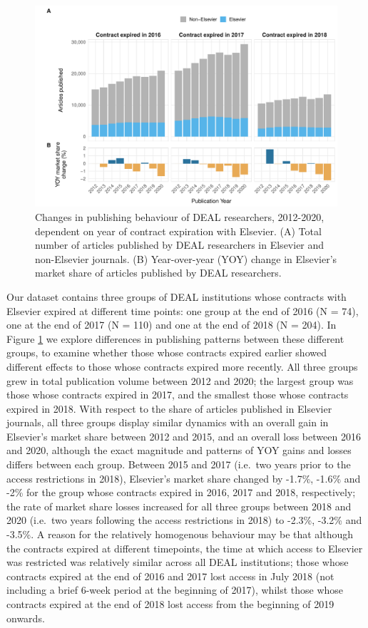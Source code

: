 \documentclass[
]{article}
\begin{document}
\begin{figure}

{\centering \includegraphics[width=0.75\linewidth]{analysis_files/figure-latex/items-publisher-year-cancellation-1} 

}

\caption{Changes in publishing behaviour of DEAL researchers, 2012-2020, dependent on year of contract expiration with Elsevier. (A) Total number of articles published by DEAL researchers in Elsevier and non-Elsevier journals. (B) Year-over-year (YOY) change in Elsevier's market share of articles published by DEAL researchers.}\label{fig:items-publisher-year-cancellation}
\end{figure}

Our dataset contains three groups of DEAL institutions whose contracts with Elsevier expired at different time points: one group at the end of 2016 (N = 74), one at the end of 2017 (N = 110) and one at the end of 2018 (N = 204). In Figure \ref{fig:items-publisher-year-cancellation} we explore differences in publishing patterns between these different groups, to examine whether those whose contracts expired earlier showed different effects to those whose contracts expired more recently. All three groups grew in total publication volume between 2012 and 2020; the largest group was those whose contracts expired in 2017, and the smallest those whose contracts expired in 2018. With respect to the share of articles published in Elsevier journals, all three groups display similar dynamics with an overall gain in Elsevier's market share between 2012 and 2015, and an overall loss between 2016 and 2020, although the exact magnitude and patterns of YOY gains and losses differs between each group. Between 2015 and 2017 (i.e.~two years prior to the access restrictions in 2018), Elsevier's market share changed by -1.7\%, -1.6\% and -2\% for the group whose contracts expired in 2016, 2017 and 2018, respectively; the rate of market share losses increased for all three groups between 2018 and 2020 (i.e.~two years following the access restrictions in 2018) to -2.3\%, -3.2\% and -3.5\%. A reason for the relatively homogenous behaviour may be that although the contracts expired at different timepoints, the time at which access to Elsevier was restricted was relatively similar across all DEAL institutions; those whose contracts expired at the end of 2016 and 2017 lost access in July 2018 (not including a brief 6-week period at the beginning of 2017), whilst those whose contracts expired at the end of 2018 lost access from the beginning of 2019 onwards.
\end{document}

